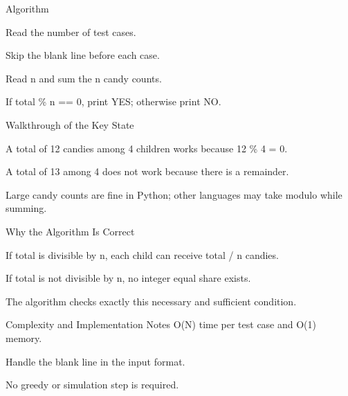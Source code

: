 \documentclass[aspectratio=169,11pt]{beamer}
\begin{document}
\begin{frame}{Algorithm}
\begin{tightitemize}
  \item Read the number of test cases.
  \item Skip the blank line before each case.
  \item Read n and sum the n candy counts.
  \item If total \% n == 0, print YES; otherwise print NO.
\end{tightitemize}
\end{frame}

\begin{frame}{Walkthrough of the Key State}
\begin{tightitemize}
  \item A total of 12 candies among 4 children works because 12 \% 4 = 0.
  \item A total of 13 among 4 does not work because there is a remainder.
  \item Large candy counts are fine in Python; other languages may take modulo while summing.
\end{tightitemize}
\end{frame}

\begin{frame}{Why the Algorithm Is Correct}
\begin{tightitemize}
  \item If total is divisible by n, each child can receive total / n candies.
  \item If total is not divisible by n, no integer equal share exists.
  \item The algorithm checks exactly this necessary and sufficient condition.
\end{tightitemize}
\end{frame}

\begin{frame}{Complexity and Implementation Notes}
\small
{} O(N) time per test case and O(1) memory.

\vspace{0.3cm}
\begin{tightitemize}
  \item Handle the blank line in the input format.
  \item No greedy or simulation step is required.
\end{tightitemize}
\end{frame}
\end{document}
